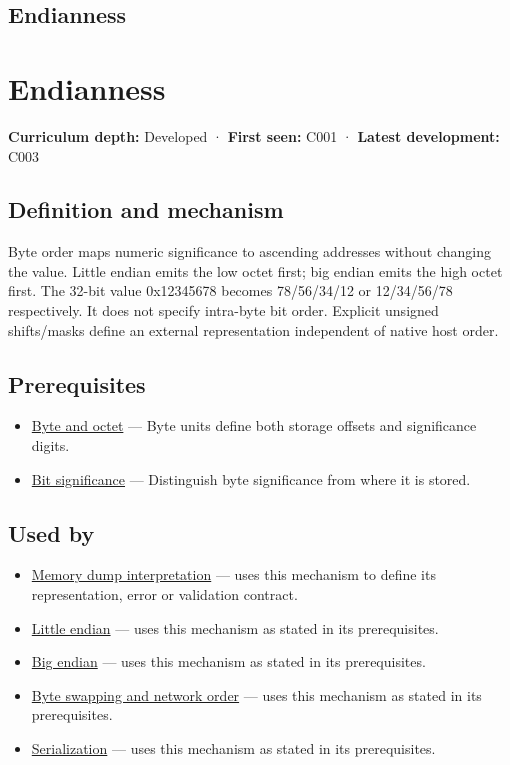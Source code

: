 \hypertarget{appendix-bc07c3d25b18}{}
\section*{Endianness}
\chapter{Endianness}\label{appendix-bc07c3d25b18-endianness}

\textbf{Curriculum depth:} Developed · \textbf{First seen:} C001 · \textbf{Latest development:} C003

\section{Definition and mechanism}\label{appendix-bc07c3d25b18-definition-and-mechanism}

Byte order maps numeric significance to ascending addresses without changing the value. Little endian emits the low octet first; big endian emits the high octet first. The 32-bit value 0x12345678 becomes 78/56/34/12 or 12/34/56/78 respectively. It does not specify intra-byte bit order. Explicit unsigned shifts/masks define an external representation independent of native host order.

\section{Prerequisites}\label{appendix-bc07c3d25b18-prerequisites}

\begin{itemize}
\tightlist
\item
  \hyperref[appendix-5bee2df85484]{Byte and octet} --- Byte units define both storage offsets and significance digits.
\item
  \hyperref[appendix-280445746493]{Bit significance} --- Distinguish byte significance from where it is stored.
\end{itemize}

\section{Used by}\label{appendix-bc07c3d25b18-used-by}

\begin{itemize}
\item
  \hyperref[appendix-230b59c0676b]{Memory dump interpretation} --- uses this mechanism to define its representation, error or validation contract.
\item
  \hyperref[appendix-367b6abf460e]{Little endian} --- uses this mechanism as stated in its prerequisites.
\item
  \hyperref[appendix-92e040df969a]{Big endian} --- uses this mechanism as stated in its prerequisites.
\item
  \hyperref[appendix-11ba36693aa2]{Byte swapping and network order} --- uses this mechanism as stated in its prerequisites.
\item
  \hyperref[appendix-91d09ebed979]{Serialization} --- uses this mechanism as stated in its prerequisites.
\end{itemize}

